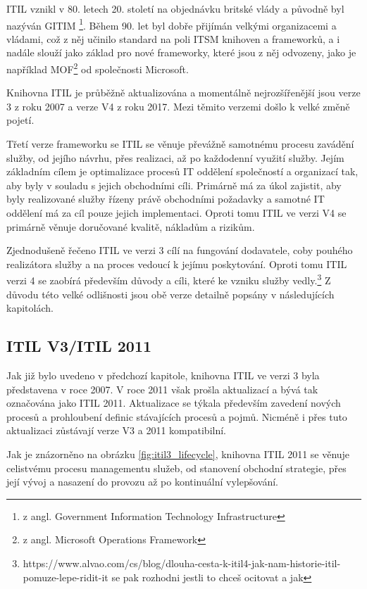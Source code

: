 \documentclass[
  digital,     %
  twoside,     %
  lof,         %
  lot,         %
]{fithesis4}
\begin{document}
ITIL vznikl v 80. letech 20. století na objednávku britské vlády a původně byl nazýván GITIM \footnote{z angl. Government Information Technology Infrastructure}. Během 90. let byl dobře přijímán velkými organizacemi a vládami, což z něj učinilo standard na poli ITSM knihoven a frameworků, a i nadále slouží jako základ pro nové frameworky, které jsou z něj odvozeny, jako je například MOF\footnote{z angl. Microsoft Operations Framework} od společnosti Microsoft. \parencite[s. ~31]{Matula2017}

Knihovna ITIL je průběžně aktualizována a momentálně nejrozšířenější jsou verze 3 z roku 2007 a verze V4 z roku 2017. Mezi těmito verzemi došlo k velké změně pojetí. 

Třetí verze frameworku se ITIL se věnuje převážně samotnému procesu zavádění služby, od jejího návrhu, přes realizaci, až po každodenní využití služby. Jejím základním cílem je optimalizace procesů IT oddělení společností a organizací tak, aby byly v souladu s jejich obchodními cíli. Primárně má za úkol zajistit, aby byly realizované služby řízeny právě obchodními požadavky a samotné IT oddělení má za cíl pouze jejich implementaci.\parencite[s.~8]{Carlidge2007} Oproti tomu ITIL ve verzi V4 se primárně věnuje doručované kvalitě, nákladům a rizikům. 

Zjednodušeně řečeno ITIL ve verzi 3 cílí na fungování dodavatele, coby pouhého realizátora služby a na proces vedoucí k jejímu poskytování. Oproti tomu ITIL verzi 4 se zaobírá především důvody a cíli, které ke vzniku služby vedly.\footnote{https://www.alvao.com/cs/blog/dlouha-cesta-k-itil4-jak-nam-historie-itil-pomuze-lepe-ridit-it se pak rozhodni jestli to chceš ocitovat a jak}
Z důvodu této velké  odlišnosti jsou obě verze detailně popsány v následujících kapitolách.  
\subsection{ITIL V3/ITIL 2011}
Jak již bylo uvedeno v předchozí kapitole, knihovna ITIL ve verzi 3 byla představena v roce 2007. V roce 2011 však prošla aktualizací a bývá tak označována jako ITIL 2011. Aktualizace se týkala především zavedení nových procesů a prohloubení definic stávajících procesů a pojmů. Nicméně i přes tuto aktualizaci zůstávají verze V3 a 2011 kompatibilní.\parencite{Kempter2722013}

Jak je znázorněno na obrázku \ref{fig:itil3_lifecycle}, knihovna ITIL 2011 se věnuje celistvému procesu managementu služeb, od stanovení obchodní strategie, přes její vývoj a nasazení do provozu až po kontinuální vylepšování. 
  
\end{document}

